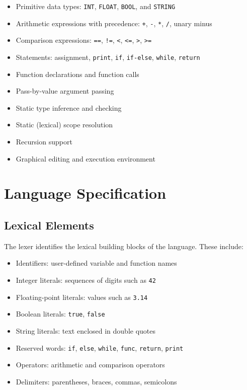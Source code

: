 \documentclass[12pt,a4paper]{article}
\begin{document}
\begin{itemize}[leftmargin=1.0cm]
    \item Primitive data types: \texttt{INT}, \texttt{FLOAT}, \texttt{BOOL}, and \texttt{STRING}
    \item Arithmetic expressions with precedence: \texttt{+}, \texttt{-}, \texttt{*}, \texttt{/}, unary minus
    \item Comparison expressions: \texttt{==}, \texttt{!=}, \texttt{<}, \texttt{<=}, \texttt{>}, \texttt{>=}
    \item Statements: assignment, \texttt{print}, \texttt{if}, \texttt{if-else}, \texttt{while}, \texttt{return}
    \item Function declarations and function calls
    \item Pass-by-value argument passing
    \item Static type inference and checking
    \item Static (lexical) scope resolution
    \item Recursion support
    \item Graphical editing and execution environment
\end{itemize}

\section{Language Specification}
\subsection{Lexical Elements}
The lexer identifies the lexical building blocks of the language. These include:

\begin{itemize}[leftmargin=1.0cm]
    \item Identifiers: user-defined variable and function names
    \item Integer literals: sequences of digits such as \texttt{42}
    \item Floating-point literals: values such as \texttt{3.14}
    \item Boolean literals: \texttt{true}, \texttt{false}
    \item String literals: text enclosed in double quotes
    \item Reserved words: \texttt{if}, \texttt{else}, \texttt{while}, \texttt{func}, \texttt{return}, \texttt{print}
    \item Operators: arithmetic and comparison operators
    \item Delimiters: parentheses, braces, commas, semicolons
\end{itemize}
\end{document}
